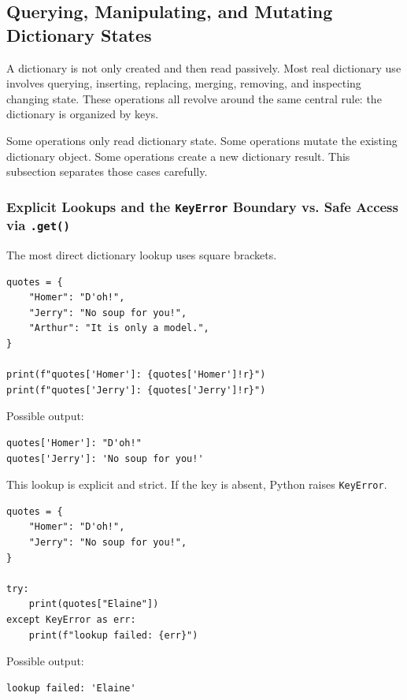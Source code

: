 \subsection{Querying, Manipulating, and Mutating Dictionary States}

A dictionary is not only created and then read passively. Most real dictionary use involves querying, inserting, replacing, merging, removing, and inspecting changing state. These operations all revolve around the same central rule: the dictionary is organized by keys.

Some operations only read dictionary state. Some operations mutate the existing dictionary object. Some operations create a new dictionary result. This subsection separates those cases carefully.

\subsubsection{Explicit Lookups and the \texttt{KeyError} Boundary vs. Safe Access via \texttt{.get()}}

The most direct dictionary lookup uses square brackets.

\begin{verbatim}
quotes = {
    "Homer": "D'oh!",
    "Jerry": "No soup for you!",
    "Arthur": "It is only a model.",
}

print(f"quotes['Homer']: {quotes['Homer']!r}")
print(f"quotes['Jerry']: {quotes['Jerry']!r}")
\end{verbatim}

Possible output:

\begin{verbatim}
quotes['Homer']: "D'oh!"
quotes['Jerry']: 'No soup for you!'
\end{verbatim}

This lookup is explicit and strict. If the key is absent, Python raises \texttt{KeyError}.

\begin{verbatim}
quotes = {
    "Homer": "D'oh!",
    "Jerry": "No soup for you!",
}

try:
    print(quotes["Elaine"])
except KeyError as err:
    print(f"lookup failed: {err}")
\end{verbatim}

Possible output:

\begin{verbatim}
lookup failed: 'Elaine'
\end{verbatim}

